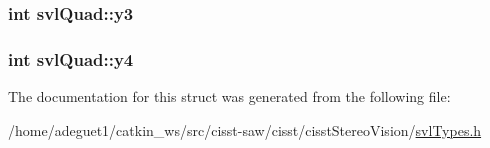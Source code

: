 \hypertarget{structsvl_quad_a0e4a4b82cc4977a4ac0e9159983e0d89}{
\subsubsection[{y3}]{\setlength{\rightskip}{0pt plus 5cm}int svl\-Quad\-::y3}}\label{structsvl_quad_a0e4a4b82cc4977a4ac0e9159983e0d89}
\hypertarget{structsvl_quad_ab868a587999108937b8dd2748e90e1dd}{
\subsubsection[{y4}]{\setlength{\rightskip}{0pt plus 5cm}int svl\-Quad\-::y4}}\label{structsvl_quad_ab868a587999108937b8dd2748e90e1dd}


The documentation for this struct was generated from the following file\-:\begin{DoxyCompactItemize}
\item 
/home/adeguet1/catkin\-\_\-ws/src/cisst-\/saw/cisst/cisst\-Stereo\-Vision/\hyperlink{svl_types_8h}{svl\-Types.\-h}\end{DoxyCompactItemize}
